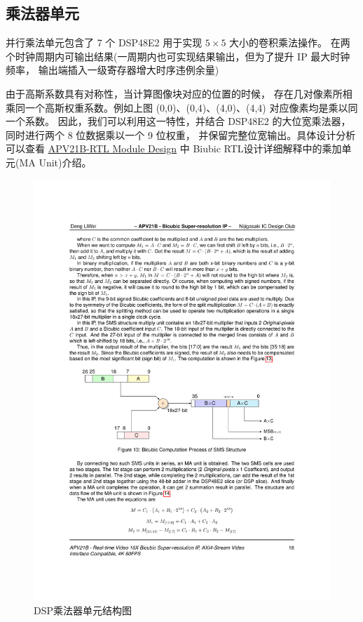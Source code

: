 \documentclass[12pt, a4paper, oneside]{ctexbook}
\begin{document}
	\subsection{乘法器单元} \label{mul_unit}
	并行乘法单元包含了 7 个 DSP48E2 用于实现 $5\times5$ 大小的卷积乘法操作。
	在两个时钟周期内可输出结果(一周期内也可实现结果输出，但为了提升 IP 最大时钟频率，
	输出端插入一级寄存器增大时序违例余量)\par 由于高斯系数具有对称性，当计算图像块对应的位置的时候，
	存在几对像素所相乘同一个高斯权重系数。例如上图 (0,0)、(0,4)、(4,0)、(4,4) 对应像素均是乘以同一个系数。
	因此，我们可以利用这一特性，并结合 DSP48E2 的大位宽乘法器，同时进行两个 8 位数据乘以一个 9 位权重，
	并保留完整位宽输出。具体设计分析可以查看 \href{./ref/APV21B_RTL_Module_Design.pdf}{APV21B-RTL Module Design} 中 Biubic RTL设计详细解释中的乘加单元(MA Unit)介绍。%
		\begin{figure}[h]
			\centering
			\includegraphics[scale=1]{pic/mul_unit}
			\caption{DSP乘法器单元结构图}
			\label{fig:mulunit}
		\end{figure}
\end{document}
